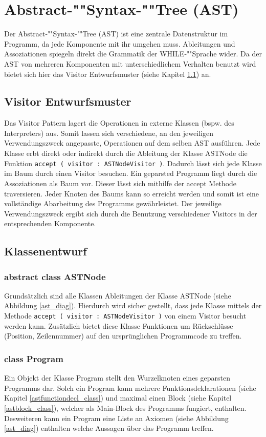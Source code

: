 \section{Abstract-""Syntax-""Tree (AST)}

Der Abstract-""Syntax-""Tree (AST) ist eine zentrale Datenstruktur im Programm, da jede Komponente mit ihr umgehen muss. Ableitungen und Assoziationen spiegeln direkt die Grammatik der WHILE-""Sprache wider. Da der AST von mehreren Komponenten mit unterschiedlichem Verhalten benutzt wird bietet sich hier das Visitor Entwurfsmuster (siehe Kapitel \ref{astvisitor_sec}) an.

\subsection{Visitor Entwurfsmuster}
\label{astvisitor_sec}
Das Visitor Pattern lagert die Operationen in externe Klassen (bspw. des Interpreters) aus. Somit lassen sich verschiedene, an den jeweiligen Verwendungszweck angepasste, Operationen auf dem selben AST ausführen. Jede Klasse erbt direkt oder indirekt durch die Ableitung der Klasse ASTNode die Funktion \texttt{accept ( visitor : ASTNodeVisitor )}. Dadurch lässt sich jede Klasse im Baum durch einen Visitor besuchen.
Ein geparsted Programm liegt durch die Assoziationen als Baum vor. Dieser lässt sich mithilfe der accept Methode traversieren. Jeder Knoten des Baums kann so erreicht werden und somit ist eine vollständige Abarbeitung des Programms gewährleistet. Der jeweilige Verwendungszweck ergibt sich durch die Benutzung verschiedener Visitors in der entsprechenden Komponente. 

\subsection{Klassenentwurf}
\subsubsection{abstract class ASTNode}
\label{astnode_class}
Grundsätzlich sind alle Klassen Ableitungen der Klasse ASTNode (siehe Abbildung \ref{ast_diag}). Hierdurch wird sicher gestellt, dass jede Klasse mittels der Methode \texttt{accept ( visitor : ASTNodeVisitor )} von einem Visitor besucht werden kann. Zusätzlich bietet diese Klasse Funktionen um Rückschlüsse (Position, Zeilennummer) auf den ursprünglichen Programmcode zu treffen.

\subsubsection{class Program}
Ein Objekt der Klasse Program stellt den Wurzelknoten eines geparsten Programms dar. Solch ein Program kann mehrere Funktionsdeklarationen (siehe Kapitel \ref{astfunctiondecl_class}) und maximal einen Block (siehe Kapitel \ref{astblock_class}), welcher als Main-Block des Programms fungiert, enthalten. Desweiteren kann ein Program eine Liste an Axiomen (siehe Abbildung \ref{ast_diag}) enthalten welche Aussagen über das Programm treffen.

